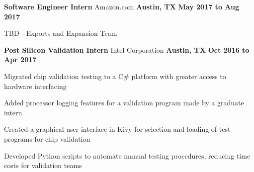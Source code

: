   \begin{cventries}
    \cventry
      {\normalsize \textbf{Software Engineer Intern}}
      {\large Amazon.com}
      {\normalsize \textbf{Austin, TX}}
      {\normalsize \textbf{May 2017 to Aug 2017}}
      {
        \begin{cvitems}
          \item {\normalsize TBD - Exports and Expansion Team}
        \end{cvitems}
      }
    \cventry
      {\normalsize \textbf{Post Silicon Validation Intern}}
      {\large Intel Corporation}
      {\normalsize \textbf{Austin, TX}}
      {\normalsize \textbf{Oct 2016 to Apr 2017}}
      {
        \begin{cvitems}
          \item {\normalsize Migrated chip validation testing to a C\# platform with greater access to hardware interfacing} 
          \item {\normalsize Added processor logging features for a validation program made by a graduate intern}
          \item {\normalsize Created a graphical user interface in Kivy for selection and loading of test programs for chip validation}
          \item {\normalsize Developed Python scripts to automate manual testing procedures, reducing time costs for validation teams}
        \end{cvitems}
      }
  \end{cventries}